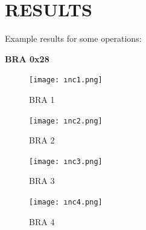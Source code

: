 \documentclass[pdftex,12pt,a4paper]{article}
\begin{document}
	
	
	
	
	
	
	
	\section{RESULTS }
	Example results for some operations:\par
	\textbf{BRA 0x28}
	\begin{figure}[H]
		\centering
		\texttt{[image: ınc1.png]}
		\caption{BRA 1}
		\label{fig:Operation Codes}
	\end{figure}\par 
	\begin{figure}[H]
		\centering
		\texttt{[image: ınc2.png]}
		\caption{BRA 2}
		\label{fig:Operation Codes}
	\end{figure}\par 
	\begin{figure}[H]
		\centering
		\texttt{[image: ınc3.png]}
		\caption{BRA 3}
		\label{fig:Operation Codes}
	\end{figure}\par 
	\begin{figure}[H]
		\centering
		\texttt{[image: ınc4.png]}
		\caption{BRA 4}
		\label{fig:Operation Codes}
	\end{figure}\par 
	
\end{document}
